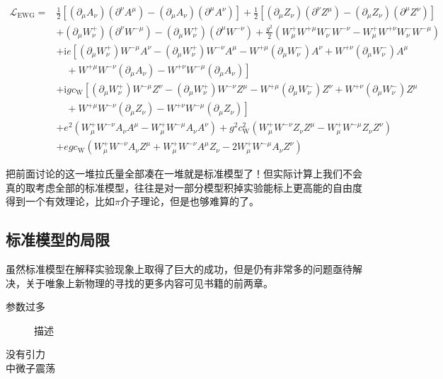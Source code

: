 \begin{equation}
	\begin{aligned}
		\mathcal{L}_{\mathrm{EWG}}= & \frac{1}{2}\left[\left(\partial_{\mu} A_{\nu}\right)\left(\partial^{\nu} A^{\mu}\right)-\left(\partial_{\mu} A_{\nu}\right)\left(\partial^{\mu} A^{\nu}\right)\right]+\frac{1}{2}\left[\left(\partial_{\mu} Z_{\nu}\right)\left(\partial^{\nu} Z^{\mu}\right)-\left(\partial_{\mu} Z_{\nu}\right)\left(\partial^{\mu} Z^{\nu}\right)\right] \\
		& +\left(\partial_{\mu} W_{\nu}^{+}\right)\left(\partial^{\nu} W^{-\mu}\right)-\left(\partial_{\mu} W_{\nu}^{+}\right)\left(\partial^{\mu} W^{-\nu}\right)+\frac{g^{2}}{2}\left(W_{\mu}^{+} W^{+\mu} W_{\nu}^{-} W^{-\nu}-W_{\mu}^{+} W^{+\nu} W_{\nu}^{-} W^{-\mu}\right) \\
		& +\mathrm{i} e\left[\left(\partial_{\mu} W_{\nu}^{+}\right) W^{-\mu} A^{\nu}-\left(\partial_{\mu} W_{\nu}^{+}\right) W^{-\nu} A^{\mu}-W^{+\mu}\left(\partial_{\mu} W_{\nu}^{-}\right) A^{\nu}+W^{+\nu}\left(\partial_{\mu} W_{\nu}^{-}\right) A^{\mu}\right. \\
		& \left.\quad+W^{+\mu} W^{-\nu}\left(\partial_{\mu} A_{\nu}\right)-W^{+\nu} W^{-\mu}\left(\partial_{\mu} A_{\nu}\right)\right] \\
		& +\mathrm{i} g c_{\mathrm{W}}\left[\left(\partial_{\mu} W_{\nu}^{+}\right) W^{-\mu} Z^{\nu}-\left(\partial_{\mu} W_{\nu}^{+}\right) W^{-\nu} Z^{\mu}-W^{+\mu}\left(\partial_{\mu} W_{\nu}^{-}\right) Z^{\nu}+W^{+\nu}\left(\partial_{\mu} W_{\nu}^{-}\right) Z^{\mu}\right. \\
		& \left.\quad+W^{+\mu} W^{-\nu}\left(\partial_{\mu} Z_{\nu}\right)-W^{+\nu} W^{-\mu}\left(\partial_{\mu} Z_{\nu}\right)\right] \\
		& +e^{2}\left(W_{\mu}^{+} W^{-\nu} A_{\nu} A^{\mu}-W_{\mu}^{+} W^{-\mu} A_{\nu} A^{\nu}\right)+g^{2} c_{\mathrm{W}}^{2}\left(W_{\mu}^{+} W^{-\nu} Z_{\nu} Z^{\mu}-W_{\mu}^{+} W^{-\mu} Z_{\nu} Z^{\nu}\right)\\
		&+egc_{\mathrm{W}}(W_{\mu}^{+}W^{-\nu}A_{\nu}Z^{\mu}+W_{\mu}^{+}W^{-\nu}A^{\mu}Z_{\nu}-2W_{\mu}^{+}W^{-\mu}A_{\nu}Z^{\nu})
	\end{aligned}
\end{equation}

把前面讨论的这一堆拉氏量全部凑在一堆就是标准模型了！但实际计算上我们不会真的取考虑全部的标准模型，往往是对一部分模型积掉实验能标上更高能的自由度得到一个有效理论，比如$\pi$介子理论，但是也够难算的了。
\subsection{标准模型的局限}
虽然标准模型在解释实验现象上取得了巨大的成功，但是仍有非常多的问题亟待解决，关于唯象上新物理的寻找的更多内容可见书籍\cite{baer_weak_2006}的前两章。
\begin{description}
	\item[参数过多] 描述
	\item[没有引力]
	\item[中微子震荡]
\end{description}